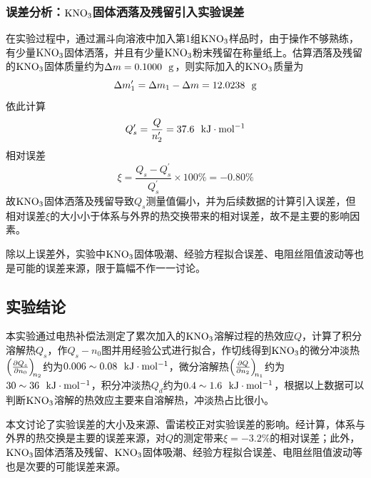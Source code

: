 \documentclass[12pt]{article}
\begin{document}
 			\subsubsection{误差分析：$\rm KNO_{3}$固体洒落及残留引入实验误差}
 			在实验过程中，通过漏斗向溶液中加入第1组$\rm KNO_{3}$样品时，由于操作不够熟练，有少量$\rm KNO_{3}$固体洒落，并且有少量$\rm KNO_{3}$粉末残留在称量纸上。估算洒落及残留的$\rm KNO_{3}$固体质量约为$\Delta m=0.1000\ \ {\rm g}$，则实际加入的$\rm KNO_{3}$质量为
 			$$\Delta m^{\prime}_{1}=\Delta m_{1}-\Delta m=12.0238\ \ {\rm g}$$
 			依此计算
 			$$
 			Q^{\prime}_{s}=\frac{Q}{n^{\prime}_{2}}=37.6\ \ {\rm kJ\cdot mol^{-1}}
 			$$
 			相对误差
 			$$
 			\xi=\frac{Q_{s}-Q^{\prime}_{s}}{Q^{\prime}_{s}}\times 100\%=-0.80\%
 			$$
 			故$\rm KNO_{3}$固体洒落及残留导致$Q_{s}$测量值偏小，并为后续数据的计算引入误差，但相对误差$\xi$的大小小于体系与外界的热交换带来的相对误差，故不是主要的影响因素。\par 
 			除以上误差外，实验中$\rm KNO_{3}$固体吸潮、经验方程拟合误差、电阻丝阻值波动等也是可能的误差来源，限于篇幅不作一一讨论。 	
		
 			
 		



 	 \subsection{实验结论}
 	 本实验通过电热补偿法测定了累次加入的$\rm KNO_{3}$溶解过程的热效应$Q$，计算了积分溶解热$Q_{s}$，作$Q_{s}-n_{0}$图并用经验公式进行拟合，作切线得到$\rm KNO_{3}$的微分冲淡热$\diffp  {Q_{s}}{n_{0}}[n_{2}]$约为$0.006\sim 0.08\ \ {\rm kJ\cdot mol^{-1}}$，微分溶解热$\diffp  {Q}{n_{2}}[n_{1}]$约为$30\sim 36\ \ {\rm kJ\cdot mol^{-1}}$，积分冲淡热$Q_{d}$约为$0.4\sim 1.6\ \ {\rm kJ\cdot mol^{-1}}$，根据以上数据可以判断$\rm KNO_{3}$溶解的热效应主要来自溶解热，冲淡热占比很小。\par 
 	 本文讨论了实验误差的大小及来源、雷诺校正对实验误差的影响。经计算，体系与外界的热交换是主要的误差来源，对$Q$的测定带来$\xi=-3.2\%$的相对误差；此外，$\rm KNO_{3}$固体洒落及残留、$\rm KNO_{3}$固体吸潮、经验方程拟合误差、电阻丝阻值波动等也是次要的可能误差来源。


 

   

\vbox{}



\end{document}
